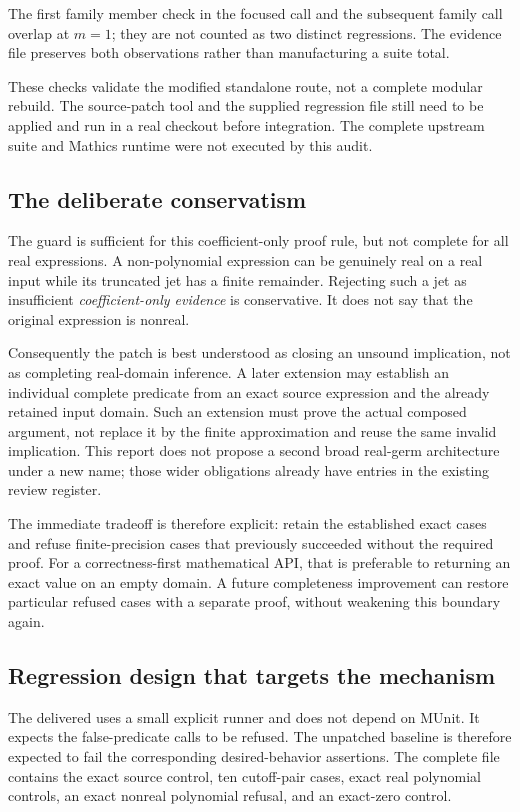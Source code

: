 \documentclass[11pt,letterpaper]{article}
\newcommand{\code}[1]{\texttt{\small\detokenize{#1}}}
\begin{document}
The first family member check in the focused call and the subsequent family call overlap at \(m=1\); they are not counted as two distinct regressions. The evidence file preserves both observations rather than manufacturing a suite total.

These checks validate the modified standalone route, not a complete modular rebuild. The source-patch tool and the supplied regression file still need to be applied and run in a real checkout before integration. The complete upstream suite and Mathics runtime were not executed by this audit.

\subsection{The deliberate conservatism}
The guard is sufficient for this coefficient-only proof rule, but not complete for all real expressions. A non-polynomial expression can be genuinely real on a real input while its truncated jet has a finite remainder. Rejecting such a jet as insufficient \emph{coefficient-only evidence} is conservative. It does not say that the original expression is nonreal.

Consequently the patch is best understood as closing an unsound implication, not as completing real-domain inference. A later extension may establish an individual complete predicate from an exact source expression and the already retained input domain. Such an extension must prove the actual composed argument, not replace it by the finite approximation and reuse the same invalid implication. This report does not propose a second broad real-germ architecture under a new name; those wider obligations already have entries in the existing review register.\cite{register}

The immediate tradeoff is therefore explicit: retain the established exact cases and refuse finite-precision cases that previously succeeded without the required proof. For a correctness-first mathematical API, that is preferable to returning an exact value on an empty domain. A future completeness improvement can restore particular refused cases with a separate proof, without weakening this boundary again.

\subsection{Regression design that targets the mechanism}
The delivered \code{tests/PredicateRealness.wl} uses a small explicit runner and does not depend on MUnit. It expects the false-predicate calls to be refused. The unpatched baseline is therefore expected to fail the corresponding desired-behavior assertions. The complete file contains the exact source control, ten cutoff-pair cases, exact real polynomial controls, an exact nonreal polynomial refusal, and an exact-zero control.
\end{document}
